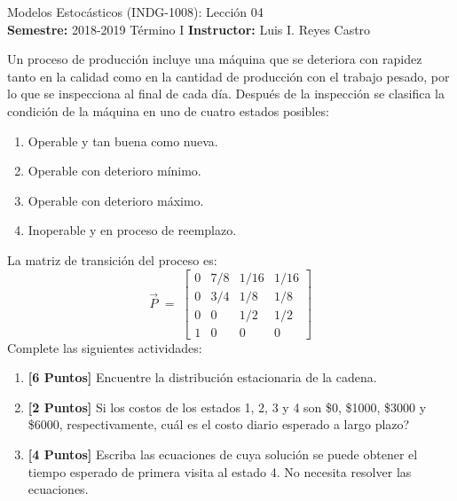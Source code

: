 \documentclass[ a4paper, twoside, 11pt]{article}
\newcommand{\numero}{04}
\begin{document}
\allowdisplaybreaks



\begin{center}
\Large Modelos Estoc\'asticos (INDG-1008): Lecci\'on \numero \\[1ex]
\small \textbf{Semestre:} 2018-2019 T\'ermino I \qquad
\textbf{Instructor:} Luis I. Reyes Castro
\end{center}
\fullskip

\begin{problem}
Un proceso de producci\'on incluye una m\'aquina que se deteriora con rapidez tanto en la calidad como en la cantidad de producci\'on con el trabajo pesado, por lo que se inspecciona al final de cada d\'ia. Despu\'es de la inspecci\'on se clasifica la condici\'on de la m\'aquina en uno de cuatro estados posibles:
\begin{enumerate}
\item Operable y tan buena como nueva. 
\item Operable con deterioro m\'inimo. 
\item Operable con deterioro m\'aximo. 
\item Inoperable y en proceso de reemplazo. 
\end{enumerate}
La matriz de transici\'on del proceso es: 
\[
\vec{P} \; = \; \left[
\begin{array}{cccc}
0 & 7/8 & 1/16 & 1/16 \\
0 & 3/4 & 1/8  & 1/8 \\
0 & 0   & 1/2  & 1/2 \\
1 & 0   & 0    & 0
\end{array} \right]
\]
Complete las siguientes actividades: 
\begin{enumerate}[label=\textbf{\alph*)}]
\item \textbf{[6 Puntos]} Encuentre la distribuci\'on estacionaria de la cadena. 
\item \textbf{[2 Puntos]} Si los costos de los estados 1, 2, 3 y 4 son \$0, \$1000, \$3000 y \$6000, respectivamente, cu\'al es el costo diario esperado a largo plazo? 
\item \textbf{[4 Puntos]} Escriba las ecuaciones de cuya soluci\'on se puede obtener el tiempo esperado de primera visita al estado 4. No necesita resolver las ecuaciones. 
\end{enumerate}
\QED

\end{problem}
\fullskip
\end{document}
